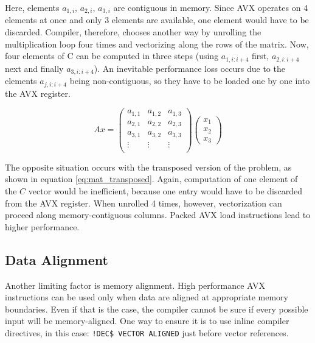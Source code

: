 \documentclass[journal, a4paper]{IEEEtran}
\begin{document}
  Here, elements $a_{1, i}$, $a_{2, i}$, $a_{3, i}$ are contiguous in memory. Since AVX operates on 4 elements at once and only 3 elements are available, one element would have to be discarded. Compiler, therefore, chooses another way by unrolling the multiplication loop four times and vectorizing along the rows of the matrix. Now, four elements of C can be computed in three steps (using $a_{1, i:i+4}$ first, $a_{2, i:i+4}$ next and finally $a_{3, i:i+4}$). An inevitable performance loss occurs due to the elements $a_{j, i:i+4}$ being non-contiguous, so they have to be loaded one by one into the AVX register.    
    
\begin{equation}
  Ax = 
        \begin{pmatrix}
          a_{1, 1} & a_{1, 2} & a_{1, 3} \\
          a_{2, 1} & a_{2, 2} & a_{2, 3} \\
          a_{3, 1} & a_{3, 2} & a_{3, 3} \\
          \vdots & \vdots & \vdots \\
        \end{pmatrix}
        \begin{pmatrix}
         x_1 \\ x_2 \\ x_3
        \end{pmatrix}
        \label{eq:mat_transposed}
\end{equation}

  The opposite situation occurs with the transposed version of the problem, as shown in equation \ref{eq:mat_transposed}. Again, computation of one element of the $C$ vector would be inefficient, because one entry would have to be discarded from the AVX register. When unrolled 4 times, however, vectorization can proceed along memory-contiguous columns. Packed AVX load instructions lead to higher performance. 
    
  \subsection{Data Alignment}
    Another limiting factor is memory alignment. High performance AVX instructions can be used only when data are aligned at appropriate memory boundaries. Even if that is the case, the compiler cannot be sure if every possible input will be memory-aligned. One way to ensure it is to use inline compiler directives, in this case: \texttt{!DEC\$ VECTOR ALIGNED} just before vector references.
  
\end{document}
